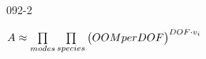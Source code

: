 \begin{mitframe}{092-2}
	\begin{listtwo}
    	\item $\helmholtz\approx\prod\limits_{modes}\prod\limits_{species}\big(OOMperDOF\big)^{DOF\cdot\vvel_{\state}}$
    \end{listtwo}        
\end{mitframe}